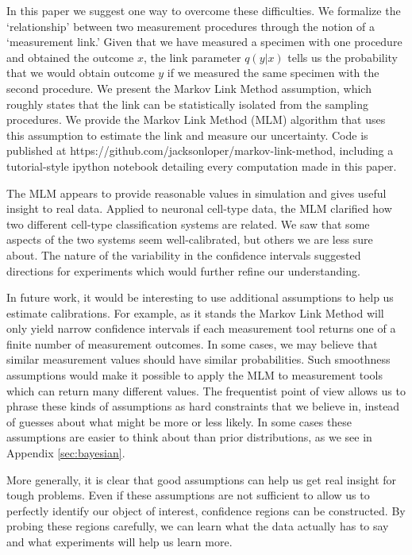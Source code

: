\begin{itemize}
In this paper we suggest one way to overcome these difficulties.  We formalize the `relationship' between two measurement procedures through the notion of a `measurement link.'  Given that we have measured a specimen with one procedure and obtained the outcome $x$, the link parameter $q(y|x)$ tells us the probability that we would obtain outcome $y$ if we measured the same specimen with the second procedure.  We present the Markov Link Method assumption, which roughly states that the link can be statistically isolated from the sampling procedures.  We provide the Markov Link Method (MLM) algorithm that uses this assumption to estimate the link and measure our uncertainty.  Code is published at https://github.com/jacksonloper/markov-link-method, including a tutorial-style ipython notebook detailing every computation made in this paper.

The MLM appears to provide reasonable values in simulation and gives useful insight to real data.  Applied to neuronal cell-type data, the MLM clarified how two different cell-type classification systems are related.  We saw that some aspects of the two systems seem well-calibrated, but others we are less sure about.  The nature of the variability in the confidence intervals suggested directions for experiments which would further refine our understanding.  

In future work, it would be interesting to use additional assumptions to help us estimate calibrations.  For example, as it stands the Markov Link Method will only yield narrow confidence intervals if each measurement tool returns one of a finite number of measurement outcomes.  In some cases, we may believe that similar measurement values should have similar probabilities.  Such smoothness assumptions would make it possible to apply the MLM to measurement tools which can return many different values.  The frequentist point of view allows us to phrase these kinds of assumptions as hard constraints that we believe in, instead of guesses about what might be more or less likely.  In some cases these assumptions are easier to think about than prior distributions, as we see in Appendix \ref{sec:bayesian}.  

More generally, it is clear that good assumptions can help us get real insight for tough problems. Even if these assumptions are not sufficient to allow us to perfectly identify our object of interest, confidence regions can be constructed.  By probing these regions carefully, we can learn what the data actually has to say and what experiments will help us learn more.


\end{itemize}
